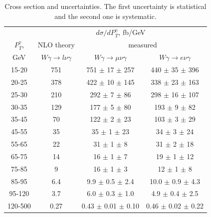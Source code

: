 \begin{table}[h]
  \scriptsize
  \begin{center}
  \caption{Cross section and uncertainties. The first uncertainty is statistical and the second one is systematic.}
  \begin{tabular}{|c|c|c|c|}
     \hline
                     & \multicolumn{3}{|c|}{$d\sigma/dP_{T}^{\gamma}$, fb/GeV} \\ 
     $P_T^{\gamma}$, & NLO theory                          &  \multicolumn{2}{|c|}{measured}      \\
    GeV              &  $W\gamma\rightarrow l\nu\gamma$ & $W\gamma\rightarrow \mu\nu\gamma$  & $W\gamma\rightarrow e\nu\gamma$    \\ \hline
    15-20 & 751 & 751 $\pm$ 17 $\pm$ 257 & 440 $\pm$ 35 $\pm$ 396\\ \hline
    20-25 & 378 & 422 $\pm$ 10 $\pm$ 145 & 338 $\pm$ 23 $\pm$ 163\\ \hline
    25-30 & 210 & 292 $\pm$ 7 $\pm$ 86 & 298 $\pm$ 16 $\pm$ 107\\ \hline
    30-35 & 129 & 177 $\pm$ 5 $\pm$ 80  & 193 $\pm$ 9 $\pm$ 82\\ \hline
    35-45 & 70 & 122 $\pm$ 2 $\pm$ 23 & 103 $\pm$ 3 $\pm$ 29\\ \hline
    45-55 & 35 & 35 $\pm$ 1 $\pm$ 23 & 34 $\pm$ 3 $\pm$ 24\\ \hline
    55-65 & 22 & 31 $\pm$ 1 $\pm$ 8  & 31 $\pm$ 2 $\pm$ 18\\ \hline
    65-75 & 14 & 16 $\pm$ 1 $\pm$ 7 & 19 $\pm$ 1 $\pm$ 12 \\ \hline
    75-85 & 9 & 16 $\pm$ 1 $\pm$ 3 & 12 $\pm$ 1 $\pm$ 8\\ \hline
    85-95 & 6.4 & 9.9 $\pm$ 0.5 $\pm$ 2.4 & 10.0 $\pm$ 0.9 $\pm$ 4.3\\ \hline
    95-120 & 3.7 & 6.0 $\pm$ 0.3 $\pm$ 1.0 & 4.9 $\pm$ 0.4 $\pm$ 2.5\\ \hline
    120-500 & 0.27 & 0.43 $\pm$ 0.01 $\pm$ 0.10 & 0.46 $\pm$ 0.02 $\pm$ 0.22\\ \hline
  \end{tabular}
  \label{tab:cs_mc_vs_meas_WGamma}
  \end{center}
\end{table}
 
